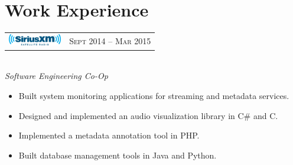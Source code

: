 \documentclass[10pt]{article}
\begin{document}
\color{text1} %



\par{
\vspace{0.2cm}
	

\begin{minipage}[t]{0.5\textwidth} %
\vspace{0pt} %


\section{Work Experience} 


\begin{tabular}{ L{5cm} R{3.5cm} }
\includegraphics[height=0.5cm]{siriusxm} & 
{\raggedleft\textsc{Sept 2014 -- Mar 2015}} \\
\end{tabular}
{\raggedright\large \\
\textit{Software Engineering Co-Op}\\[5pt]}

\begin{itemize}
  \setlength\itemsep{0.4mm}
  \item[\ding{226}] Built system monitoring applications for streaming and metadata services.
  \item[\ding{226}] Designed and implemented an audio visualization library in C\# and C.
  \item[\ding{226}] Implemented a metadata annotation tool in PHP.
   \item[\ding{226}] Built database management tools in Java and Python.
\end{itemize}


\end{minipage}}
\end{document}
